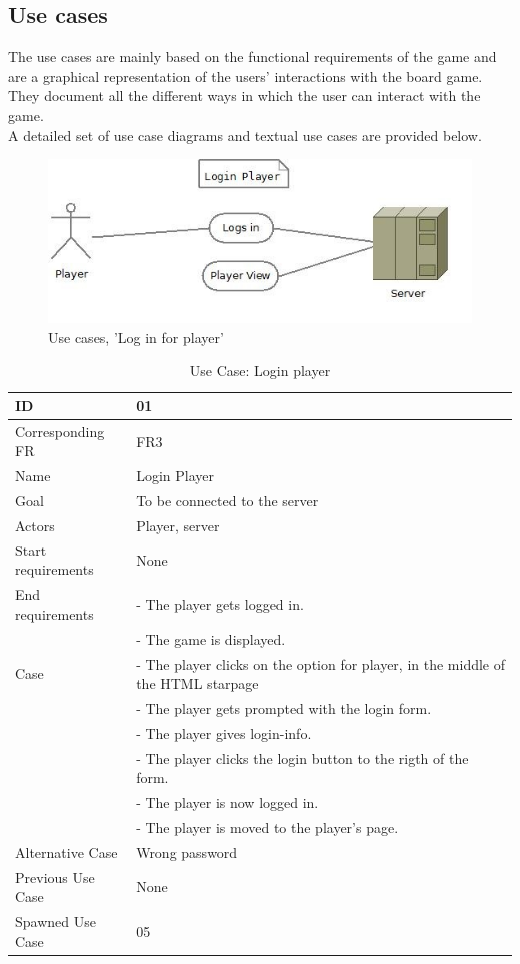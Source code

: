 \subsection{Use cases}
The use cases are mainly based on the functional requirements of the game and are a graphical representation of the users’ interactions with the board game. They document all the different ways in which the user can interact with the game. 
\\
A detailed set of use case diagrams and textual use cases are provided below.\\


\begin{figure}[H]
  \centering
    \includegraphics[width=1.0\textwidth]{img/loginplayer.jpg}
  \caption{Use cases, 'Log in for player'} 
  \label{fig:loginplayer}
\end{figure}


\begin{table}[H]
\begin{tabular}{|l|p{14cm}|} \hline
	\textbf{ID} & \textbf{01}\\ \hline
	Corresponding FR & FR3\\ \hline
	Name & Login Player\\ \hline
	Goal & To be connected to the server\\ \hline
	Actors & Player, server\\ \hline
	Start requirements & None\\ \hline
	End requirements & - The player gets logged in.\\
					 & - The game is displayed.\\ \hline
	Case & - The player clicks on the option for player, in the middle of the HTML starpage\\
			& - The player gets prompted with the login form. \\
		 	& - The player gives login-info.\\
			& - The player clicks the login button to the rigth of the form.\\
			& - The player is now logged in.\\ 
			& - The player is moved to the player's page. \\ \hline
	Alternative Case & Wrong password\\ \hline
	Previous Use Case & None\\ \hline
	Spawned Use Case & 05\\ \hline
\end{tabular}
\caption{Use Case: Login player}
\label{fig:usecase01table}
\end{table}


